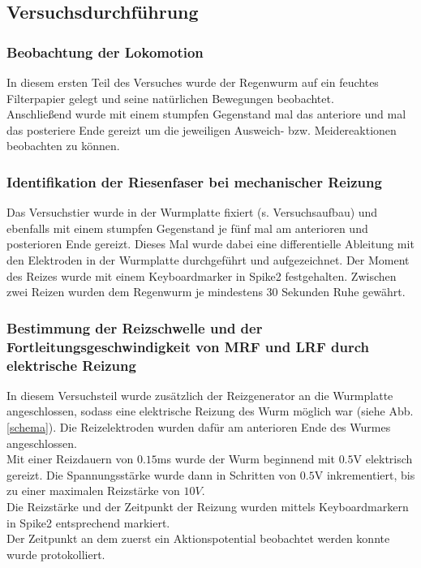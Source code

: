 \documentclass[11pt]{article}
\begin{document}
\subsection{Versuchsdurchführung}

\subsubsection{Beobachtung der Lokomotion}
In diesem ersten Teil des Versuches wurde der Regenwurm auf ein feuchtes Filterpapier gelegt und seine natürlichen Bewegungen beobachtet.\\
Anschließend wurde mit einem stumpfen Gegenstand mal das anteriore und mal das posteriere Ende gereizt um die jeweiligen Ausweich- bzw. Meidereaktionen beobachten zu können. 

\subsubsection{Identifikation der Riesenfaser bei mechanischer Reizung}
Das Versuchstier wurde in der Wurmplatte fixiert (s. Versuchsaufbau) und ebenfalls mit einem stumpfen Gegenstand je fünf mal am anterioren und posterioren Ende gereizt. Dieses Mal wurde dabei eine differentielle Ableitung mit den Elektroden in der Wurmplatte durchgeführt und aufgezeichnet. Der Moment des Reizes wurde mit einem Keyboardmarker in Spike2 festgehalten. Zwischen zwei Reizen wurden dem Regenwurm je mindestens 30 Sekunden Ruhe gewährt.

\subsubsection{Bestimmung der Reizschwelle und der Fortleitungsgeschwindigkeit von MRF und LRF durch elektrische Reizung}
In diesem Versuchsteil wurde zusätzlich der Reizgenerator an die Wurmplatte angeschlossen, sodass eine elektrische Reizung des Wurm möglich war (siehe Abb. \ref{schema}). Die Reizelektroden wurden dafür am anterioren Ende des Wurmes angeschlossen. \\
Mit einer Reizdauern von $0.15$ms wurde der Wurm beginnend mit $0.5$V elektrisch gereizt.  Die Spannungsstärke wurde dann in Schritten von $0.5$V inkrementiert, bis zu einer maximalen Reizstärke von $10V$. \\
Die Reizstärke und der Zeitpunkt der Reizung wurden mittels Keyboardmarkern in Spike2 entsprechend markiert. \\
Der Zeitpunkt an dem zuerst ein Aktionspotential beobachtet werden konnte wurde protokolliert. \\
\end{document}
